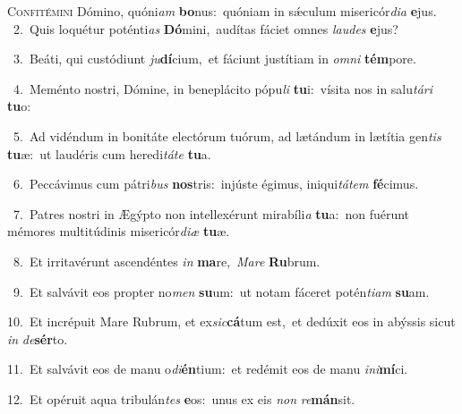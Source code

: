 \lettrine{\initial\textcolor{\initialcolor}{C}}{onfitémini} Dómino, quóni\textit{am} \textbf{bo}\-nus:~\star quóniam in sǽculum misericór\-\textit{di}\-\textit{a} \textbf{e}\-jus.\\
{\numbfont\textcolor{\numbcolor}{~2.}}~Quis loquétur poténti\textit{as} \textbf{Dó}\-mini,~\star audítas fáciet omnes \textit{lau}\-\textit{des} \textbf{e}\-jus?\par
{\numbfont\textcolor{\numbcolor}{~3.}}~Beáti, qui custódiunt \textit{ju}\-\textbf{dí}cium,~\star et fáciunt justítiam in \textit{om}\-\textit{ni} \textbf{tém}\-pore.\par
{\numbfont\textcolor{\numbcolor}{~4.}}~Meménto nostri, Dómine, in beneplácito pópu\textit{li} \textbf{tu}\-i:~\star vísita nos in salu\-\textit{tá}\-\textit{ri} \textbf{tu}\-o:\par
{\numbfont\textcolor{\numbcolor}{~5.}}~Ad vidéndum in bonitáte electórum tuórum, ad lætándum in lætítia gen\textit{tis} \textbf{tu}\-æ:~\star ut laudéris cum heredi\-\textit{tá}\-\textit{te} \textbf{tu}\-a.\par
{\numbfont\textcolor{\numbcolor}{~6.}}~Peccávimus cum pátri\textit{bus} \textbf{nos}\-tris:~\star injúste égimus, iniqui\-\textit{tá}\-\textit{tem} \textbf{fé}\-cimus.\par
{\numbfont\textcolor{\numbcolor}{~7.}}~Patres nostri in Ægýpto non intellexérunt mirabíli\textit{a} \textbf{tu}\-a:~\star non fuérunt mémores multitúdinis misericór\-\textit{di}\-\textit{æ} \textbf{tu}\-æ.\par
{\numbfont\textcolor{\numbcolor}{~8.}}~Et irritavérunt ascendéntes \textit{in} \textbf{ma}\-re,~\star \textit{Ma}\-\textit{re} \textbf{Ru}\-brum.\par
{\numbfont\textcolor{\numbcolor}{~9.}}~Et salvávit eos propter no\textit{men} \textbf{su}\-um:~\star ut notam fáceret potén\-\textit{ti}\-\textit{am} \textbf{su}\-am.\par
{\numbfont\textcolor{\numbcolor}{10.}}~Et incrépuit Mare Rubrum, et ex\-\textit{sic}\-\textbf{cá}tum est,~\star et dedúxit eos in abýssis sicut \textit{in} \textit{de}\-\textbf{sér}to.\par
{\numbfont\textcolor{\numbcolor}{11.}}~Et salvávit eos de manu o\-\textit{di}\-\textbf{én}tium:~\star et redémit eos de manu \textit{in}\-\textit{i}\textbf{mí}ci.\par
{\numbfont\textcolor{\numbcolor}{12.}}~Et opéruit aqua tribulán\textit{tes} \textbf{e}\-os:~\star unus ex eis \textit{non} \textit{re}\-\textbf{mán}sit.\par

